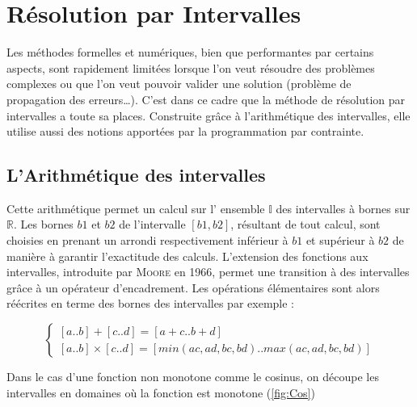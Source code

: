 \section{Résolution par Intervalles}
Les méthodes formelles et numériques, bien que performantes par certains aspects, sont rapidement limitées lorsque l'on veut résoudre des problèmes complexes ou que l'on veut pouvoir valider une solution (problème de propagation des erreurs\dots). C'est dans ce cadre que la méthode de résolution par intervalles a toute sa places. Construite grâce à l'arithmétique des intervalles, elle utilise aussi des notions apportées par la programmation par contrainte.
 
\subsection{L'Arithmétique des intervalles}
Cette arithmétique permet un calcul sur l' ensemble $\mathbb{I}$ des intervalles à bornes sur $\mathbb{R}$. Les bornes $b1$ et $b2$ de l'intervalle $[b1,b2]$, résultant de tout calcul, sont choisies en prenant un arrondi respectivement inférieur à $b1$ et supérieur à $b2$ de manière à garantir l'exactitude des calculs. L'extension des fonctions aux intervalles, introduite par \textsc{Moore} en 1966, permet une transition à des intervalles grâce à un opérateur d'encadrement. Les opérations élémentaires sont alors réécrites en terme des bornes des intervalles  par exemple : 

\begin{equation}\label{eq2}
\begin{cases}
[a .. b] + [c .. d] = [a + c .. b + d] \\
[a .. b] × [c .. d] = [min(ac, ad, bc, bd) .. max(ac, ad, bc, bd)]
\end{cases}
\end{equation}

Dans le cas d’une fonction non monotone comme le cosinus, on découpe les intervalles en domaines où la fonction est monotone  (\ref{fig:Cos})

